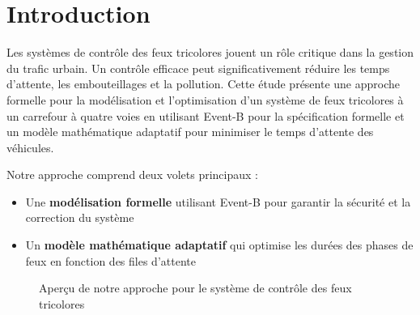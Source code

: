 


\maketitle
\tableofcontents
\newpage

\section{Introduction}
\label{sec:introduction}

Les systèmes de contrôle des feux tricolores jouent un rôle critique dans la gestion du trafic urbain. Un contrôle efficace peut significativement réduire les temps d'attente, les embouteillages et la pollution. Cette étude présente une approche formelle pour la modélisation et l'optimisation d'un système de feux tricolores à un carrefour à quatre voies en utilisant Event-B pour la spécification formelle et un modèle mathématique adaptatif pour minimiser le temps d'attente des véhicules.

Notre approche comprend deux volets principaux :
\begin{itemize}
    \item Une \textbf{modélisation formelle} utilisant Event-B pour garantir la sécurité et la correction du système
    \item Un \textbf{modèle mathématique adaptatif} qui optimise les durées des phases de feux en fonction des files d'attente
\end{itemize}

\begin{figure}[h]
\centering
{}
\caption{Aperçu de notre approche pour le système de contrôle des feux tricolores}
\label{fig:overview}
\end{figure}

